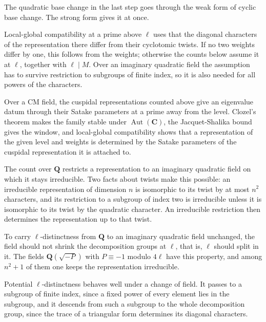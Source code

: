 The quadratic base change in the last step goes through the weak form of cyclic base change. The strong form gives it at once.

Local-global compatibility at a prime above $\ell$ uses that the diagonal characters of the representation there differ from their cyclotomic twists. If no two weights differ by one, this follows from the weights; otherwise the counts below assume it at $\ell$, together with $\ell\mid M$. Over an imaginary quadratic field the assumption has to survive restriction to subgroups of finite index, so it is also needed for all powers of the characters.

Over a CM field, the cuspidal representations counted above give an eigenvalue datum through their Satake parameters at a prime away from the level. Clozel's theorem makes the family stable under $\operatorname{Aut}(\mathbf C)$, the Jacquet-Shalika bound gives the window, and local-global compatibility shows that a representation of the given level and weights is determined by the Satake parameters of the cuspidal representation it is attached to.

The count over $\mathbf Q$ restricts a representation to an imaginary quadratic field on which it stays irreducible. Two facts about twists make this possible: an irreducible representation of dimension $n$ is isomorphic to its twist by at most $n^2$ characters, and its restriction to a subgroup of index two is irreducible unless it is isomorphic to its twist by the quadratic character. An irreducible restriction then determines the representation up to that twist.

To carry $\ell$-distinctness from $\mathbf Q$ to an imaginary quadratic field unchanged, the field should not shrink the decomposition groups at $\ell$, that is, $\ell$ should split in it. The fields $\mathbf Q(\sqrt{-P})$ with $P\equiv-1$ modulo $4\ell$ have this property, and among $n^2+1$ of them one keeps the representation irreducible.

Potential $\ell$-distinctness behaves well under a change of field. It passes to a subgroup of finite index, since a fixed power of every element lies in the subgroup, and it descends from such a subgroup to the whole decomposition group, since the trace of a triangular form determines its diagonal characters.

